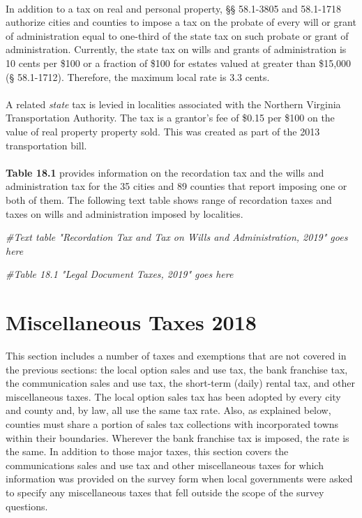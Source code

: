 \documentclass[
]{book}
\newenvironment{Shaded}{\begin{snugshade}}{\end{snugshade}}
\newcommand{\CommentTok}[1]{\textcolor[rgb]{0.56,0.35,0.01}{\textit{#1}}}
\begin{document}
~\\
\hspace*{0.333em}\hspace*{0.333em}In addition to a tax on real and personal property, §§ 58.1-3805 and 58.1-1718 authorize cities and counties to impose a tax on the probate of every will or grant of administration equal to one-third of the state tax on such probate or grant of administration. Currently, the state tax on wills and grants of administration is 10 cents per \$100 or a fraction of \$100 for estates valued at greater than \$15,000 (§ 58.1-1712). Therefore, the maximum local rate is 3.3 cents.\\
~\\
\hspace*{0.333em}\hspace*{0.333em}A related \emph{state} tax is levied in localities associated with the Northern Virginia Transportation Authority. The tax is a grantor's fee of \$0.15 per \$100 on the value of real property property sold. This was created as part of the 2013 transportation bill.\\
~\\
\hspace*{0.333em}\hspace*{0.333em}\textbf{Table 18.1} provides information on the recordation tax and the wills and administration tax for the 35 cities and 89 counties that report imposing one or both of them. The following text table shows range of recordation taxes and taxes on wills and administration imposed by localities.

\begin{Shaded}
\begin{Highlighting}[]
\CommentTok{\#Text table "Recordation Tax and Tax on Wills and Administration, 2019" goes here}

\CommentTok{\#Table 18.1 "Legal Document Taxes, 2019" goes here}
\end{Highlighting}
\end{Shaded}

\hypertarget{miscellaneous-taxes-2018}{%
\chapter{Miscellaneous Taxes 2018}\label{miscellaneous-taxes-2018}}

This section includes a number of taxes and exemptions that are not covered in the previous sections: the local option sales and use tax, the bank franchise tax, the communication sales and use tax, the short-term (daily) rental tax, and other miscellaneous taxes. The local option sales tax has been adopted by every city and county and, by law, all use the same tax rate. Also, as explained below, counties must share a portion of sales tax collections with incorporated towns within their boundaries. Wherever the bank franchise tax is imposed, the rate is the same. In addition to those major taxes, this section covers the communications sales and use tax and other miscellaneous taxes for which information was provided on the survey form when local governments were asked to specify any miscellaneous taxes that fell outside the scope of the survey questions.
\end{document}
